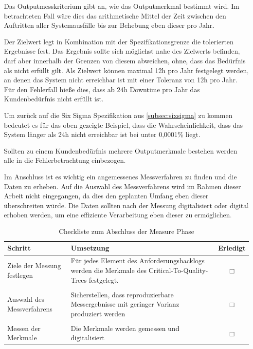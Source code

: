         Das Outputmesskriterium gibt an, wie das Outputmerkmal bestimmt wird. Im betrachteten Fall wäre dies das arithmetische Mittel der Zeit zwischen den Auftritten aller Systemausfälle bis zur Behebung eben dieser pro Jahr.

        Der Zielwert legt in Kombination mit der Spezifikationsgrenze die tolerierten Ergebnisse fest. Das Ergebnis sollte sich möglichst nahe des Zielwerts befinden, darf aber innerhalb der Grenzen von diesem abweichen, ohne, dass das Bedürfnis als nicht erfüllt gilt. Als Zielwert können maximal 12h pro Jahr festgelegt werden, an denen das System nicht erreichbar ist mit einer Toleranz von 12h pro Jahr. Für den Fehlerfall hieße dies, dass ab 24h Downtime pro Jahr das Kundenbedürfnis nicht erfüllt ist.

        Um zurück auf die Six Sigma Spezifikation aus \autoref{subsec:sixsigma} zu kommen bedeutet es für das oben gezeigte Beispiel, dass die Wahrscheinlichkeit, dass das System länger als 24h nicht erreichbar ist bei unter 0,0001\% liegt.

        Sollten zu einem Kundenbedürfnis mehrere Outputmerkmale bestehen werden alle in die Fehlerbetrachtung einbezogen.

        Im Anschluss ist es wichtig ein angemessenes Messverfahren zu finden und die Daten zu erheben. Auf die Auswahl des Messverfahrens wird im Rahmen dieser Arbeit nicht eingegangen, da dies den geplanten Umfang eben dieser überschreiten würde.
        Die Daten sollten nach der Messung digitalisiert oder digital erhoben werden, um eine effiziente Verarbeitung eben dieser zu ermöglichen.

        \begin{table}
        \label{tbl:checkDefine}
        \begin{tabularx}{\textwidth}{|p{3.5cm}|X|c|}
          \hline
          Schritt & Umsetzung & Erledigt \\
          \hline
          Ziele der Messung festlegen & Für jedes Element des Anforderungsbacklogs werden die Merkmale des Critical-To-Quality-Trees festgelegt. & $\Box$ \\
          &&\\
          Auswahl des Messverfahrens & Sicherstellen, dass reproduzierbare Messergebnisse mit geringer Varianz produziert werden & $\Box$ \\
          &&\\
          Messen der Merkmale & Die Merkmale werden gemessen und digitalisiert & $\Box$ \\
          \hline
        \end{tabularx}
        \caption{Checkliste zum Abschluss der Measure Phase}
        \end{table}

